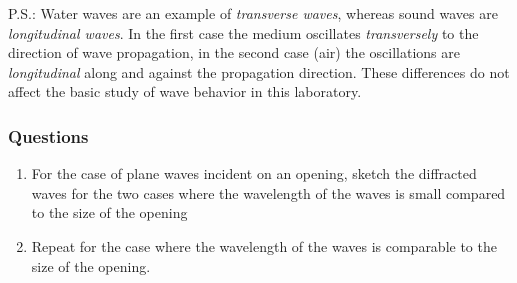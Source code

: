 \documentclass[11pt]{NSF}
\def\ben{\begin{enumerate}}
\def\een{\end{enumerate}}
\def\i{\item{}}
\begin{document}
P.S.: Water waves are an example of {\em transverse waves}, 
whereas sound waves are {\em longitudinal waves}. 
In the first case the medium oscillates {\em transversely} to 
the direction of wave propagation, in the second case (air) the 
oscillations are {\em longitudinal} along and against the 
propagation direction. 
These differences do not affect the basic study of wave behavior in this laboratory.

\subsubsection*{Questions}
\ben

\i For the case of plane waves incident on an opening, sketch the 
diffracted waves for the two cases where the wavelength of the 
waves is small compared to the size of the opening

\i Repeat for the case where the wavelength of the waves is 
comparable to the size of the opening.
\een
\end{document}
